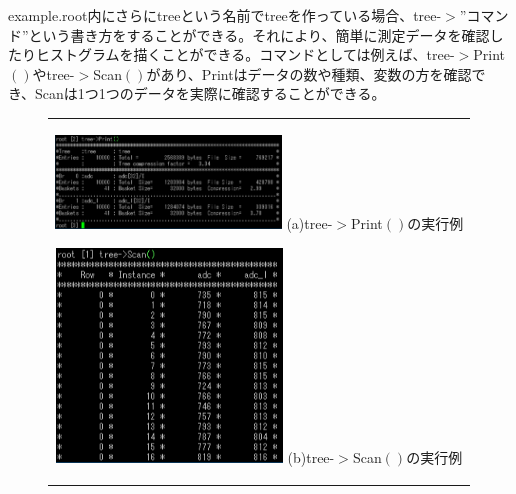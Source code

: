 \documentclass[10pt]{ujarticle}
\begin{document}
example.root内にさらにtreeという名前でtreeを作っている場合、tree-$>$''コマンド''という書き方をすることができる。それにより、簡単に測定データを確認したりヒストグラムを描くことができる。コマンドとしては例えば、tree-$>$Print$\left(\right)$やtree-$>$Scan$\left(\right)$があり、Printはデータの数や種類、変数の方を確認でき、Scanは1つ1つのデータを実際に確認することができる。
\begin{figure}[htbp]
\begin{center}
  \begin{tabular}{c}

    \begin{minipage}{0.5\hsize}
      \begin{center}
        \includegraphics[clip, width=60mm]{SummerChallenge_tree_print.png}
        \hspace{1.6cm} (a)tree-$>$Print$\left(\right)$の実行例
      \end{center}
    \end{minipage}

    \begin{minipage}{0.5\hsize}
      \begin{center}
        \includegraphics[clip, width=60mm]{SummerChallenge_tree_scan.png}
        \hspace{1.6cm} (b)tree-$>$Scan$\left(\right)$の実行例
      \end{center}
    \end{minipage}
  \end{tabular}
  \end{center}
\end{figure}
\end{document}
